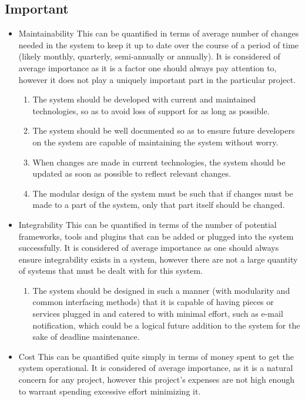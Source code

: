 	\subsection{Important}
		\begin{itemize}
			\item Maintainability
			This can be quantified in terms of average number of changes needed in the system to keep it up to date over the course of a period of time (likely monthly, quarterly, semi-annually or annually). It is considered of average importance as it is a factor one should always pay attention to, however it does not play a uniquely important part in the particular project. 
			\begin{enumerate}
				\item The system should be developed with current and maintained technologies, so as to avoid loss of support for as long as possible.
				\item The system should be well documented so as to ensure future developers on the system are capable of maintaining the system without worry.
				\item When changes are made in current technologies, the system should be updated as soon as possible to reflect relevant changes.
				\item The modular design of the system must be such that if changes must be made to a part of the system, only that part itself should be changed.
			\end{enumerate}
			\item Integrability
			This can be quantified in terms of the number of potential frameworks, tools and plugins that can be added or plugged into the system successfully. It is considered of average importance as one should always ensure integrability exists in a system, however there are not a large quantity of systems that must be dealt with for this system.
			\begin{enumerate}
				\item The system should be designed in such a manner (with modularity and common interfacing methods) that it is capable of having pieces or services plugged in and catered to with minimal effort, such as e-mail notification, which could be a logical future addition to the system for the sake of deadline maintenance.
			\end{enumerate}
			\item Cost
			This can be quantified quite simply in terms of money spent to get the system operational. It is considered of average importance, as it is a natural concern for any project, however this project's expenses are not high enough to warrant spending excessive effort minimizing it.

\end{itemize}
